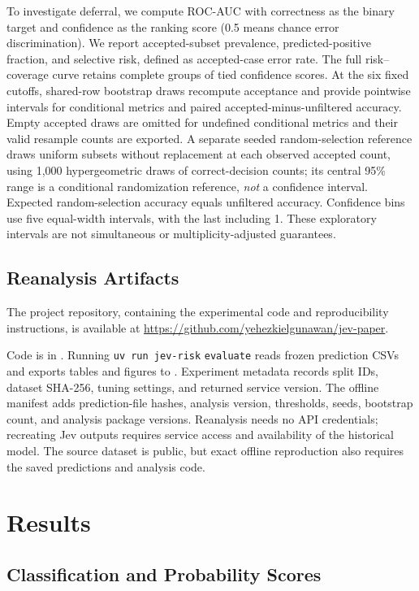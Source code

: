 \documentclass{llncs}
\begin{document}
To investigate deferral, we compute ROC-AUC with correctness as the binary target and confidence as the ranking score (0.5 means chance error discrimination). We report accepted-subset prevalence, predicted-positive fraction, and selective risk, defined as accepted-case error rate. The full risk--coverage curve retains complete groups of tied confidence scores. At the six fixed cutoffs, shared-row bootstrap draws recompute acceptance and provide pointwise intervals for conditional metrics and paired accepted-minus-unfiltered accuracy. Empty accepted draws are omitted for undefined conditional metrics and their valid resample counts are exported. A separate seeded random-selection reference draws uniform subsets without replacement at each observed accepted count, using 1,000 hypergeometric draws of correct-decision counts; its central 95\% range is a conditional randomization reference, \emph{not} a confidence interval. Expected random-selection accuracy equals unfiltered accuracy. Confidence bins use five equal-width intervals, with the last including 1. These exploratory intervals are not simultaneous or multiplicity-adjusted guarantees.

\subsection{Reanalysis Artifacts}\label{sec:artifacts}

The project repository, containing the experimental code and reproducibility instructions, is available at \url{https://github.com/yehezkielgunawan/jev-paper}.

Code is in . Running \texttt{uv run jev-risk} \texttt{evaluate} reads frozen prediction CSVs and exports tables and figures to . Experiment metadata records split IDs, dataset SHA-256, tuning settings, and returned service version. The offline manifest adds prediction-file hashes, analysis version, thresholds, seeds, bootstrap count, and analysis package versions. Reanalysis needs no API credentials; recreating Jev outputs requires service access and availability of the historical model. The source dataset is public, but exact offline reproduction also requires the saved predictions and analysis code.

\section{Results}

\subsection{Classification and Probability Scores}
\end{document}
